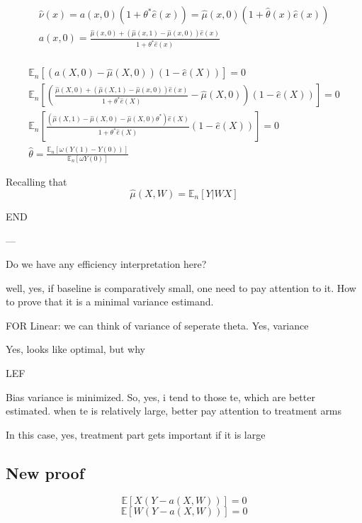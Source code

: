 \documentclass[a4paper,12pt]{article}
\theoremstyle{plain}
\begin{document}
\begin{gather*}
    \hat \nu(x) = a(x, 0) (1 + \theta^\ast \hat e(x)) = \hat \mu(x, 0) (1 + \hat \theta(x) \hat e(x)) \\
    a(x, 0) = \frac{\hat \mu(x, 0) + (\hat \mu(x, 1) - \hat \mu(x, 0)) \hat e(x)}{1 + \theta^\ast \hat e(x)} \\
\end{gather*}

    

    \begin{gather*}
        \mathbb{E}_n[(a(X, 0) - \hat\mu(X, 0)) (1 - \hat e(X))] = 0 \\
        \mathbb{E}_n\left[\left(\frac{\hat \mu(X, 0) + (\hat \mu(X, 1) - \hat \mu(x, 0)) \hat e(x)}{1 + \theta^\ast \hat e(X)} - \hat\mu(X, 0)\right) (1 - \hat e(X))\right] = 0 \\
        \mathbb{E}_n\left[\frac{(\hat \mu(X, 1) - \hat \mu(X, 0) - \hat \mu(X, 0)\theta^\ast) \hat e(X)}{1 + \theta^\ast \hat e(X)} (1 - \hat e(X))\right] = 0 \\
        \hat \theta = \frac{\mathbb{E}_n[\omega(Y(1) - Y(0))]}{\mathbb{E}_n[\omega Y(0)]}
    \end{gather*}

    Recalling that 
    $$\hat \mu(X, W) = \mathbb{E}_n[Y| W X]$$

END

---

Do we have any efficiency interpretation here?

well, yes, if baseline is comparatively small, one need to pay attention to it.
How to prove that it is a minimal variance estimand.

FOR Linear: we can think of variance of seperate theta. Yes, variance

Yes, looks like optimal, but why

LEF


Bias variance is minimized. So, yes, i tend to those te, which are better estimated.
when te is relatively large, better pay attention to treatment arms

In this case, yes, treatment part gets important if it is large

\subsection{New proof}

    $$\mathbb{E}[X(Y - a(X, W))] = 0$$
    $$\mathbb{E}[W(Y - a(X, W))] = 0$$
\end{document}
